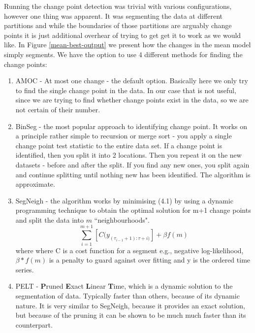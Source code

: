 \documentclass[minf,twoside,singlespacing,parskip,frontabs,notimes,12pt]{infthesis} %
\begin{document}
Running the change point detection was trivial with various configurations, however one thing was apparent. It was segmenting the data at different partitions and while the boundaries of those partitions are arguably change points it is just additional overhear of trying to get get it to work as we would like. In Figure \ref{mean-best-output} we present how the changes in the mean model simply segments. We have the option to use 4 different methods for finding the change points:
\begin{enumerate}
\item AMOC - At most one change - the default option. Basically here we only try to find the single change point in the data. In our case that is not useful, since we are trying to find whether change points exist in the data, so we are not certain of their number. 
\item BinSeg - the most popular approach to identifying change point. It works on a principle rather simple to recursion or merge sort - you apply a single change point test statistic to the entire data set. If a change point is identified, then you split it into 2 locations. Then you repeat it on the new datasets - before and after the split. If you find any new ones, you split again and continue splitting until nothing new has been identified. The algorithm is approximate.
\item SegNeigh - the algorithm works by minimising (4.1) by using a dynamic programming technique to obtain the optimal solution for m+1 change points and split the data into $m$ ``neighbourhoods".
\begin{equation}
\sum_{i=1}^{m+1} [ C(y_{(\tau_{i-1}+1):\tau+{i})}] + \beta f(m) 
\end{equation}
where where C is a cost function for a segment e.g., negative log-likelihood, $\beta*f(m)$ is a penalty to guard against over fitting and y is the ordered time series.
\item PELT - \textbf{P}runed \textbf{E}xact \textbf{L}inear \textbf{T}ime, which is a dynamic solution to the segmentation of data. Typically faster than others, because of its dynamic nature. It is very similar to SegNeigh, because it provides an exact solution, but because of the pruning it can be shown to be much much faster than its counterpart. 
\end{enumerate}
\end{document}
